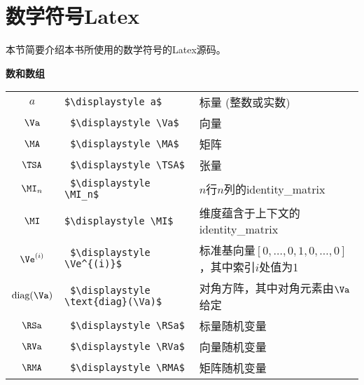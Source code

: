 \chapter*{数学符号Latex}
\label{notation}


本节简要介绍本书所使用的数学符号的Latex源码。 

\vspace{\notationgap}
\begin{minipage}{\textwidth}
\centerline{\bf 数和数组}
\bgroup
\def\arraystretch{1.5}
\begin{tabular}{clp{3.25in}}
$\displaystyle a$ & \lstinline!$\displaystyle a$! & 标量 (整数或实数) \\
$\displaystyle \Va$  & \lstinline! $\displaystyle \Va$ !  & 向量 \\
$\displaystyle \MA$ & \lstinline! $\displaystyle \MA$!  & 矩阵 \\
$\displaystyle \TSA$ & \lstinline! $\displaystyle \TSA$!  & 张量 \\
$\displaystyle \MI_n$ & \lstinline! $\displaystyle \MI_n$!  & $n$行$n$列的\gls{identity_matrix} \\
$\displaystyle \MI$ & \lstinline!$\displaystyle \MI$ !  &  维度蕴含于上下文的\gls{identity_matrix} \\
$\displaystyle \Ve^{(i)}$ & \lstinline! $\displaystyle \Ve^{(i)}$!  & 标准基向量$[0,\dots,0,1,0,\dots,0]$，其中索引$i$处值为1 \\ 
$\displaystyle \text{diag}(\Va)$ & \lstinline! $\displaystyle \text{diag}(\Va)$!  & 对角方阵，其中对角元素由$\Va$给定 \\
$\displaystyle \RSa$ & \lstinline! $\displaystyle \RSa$!  & 标量随机变量 \\
$\displaystyle \RVa$ & \lstinline! $\displaystyle \RVa$ !  & 向量随机变量 \\
$\displaystyle \RMA$ & \lstinline! $\displaystyle \RMA$!  & 矩阵随机变量 \\
\end{tabular}
\egroup
\end{minipage}

